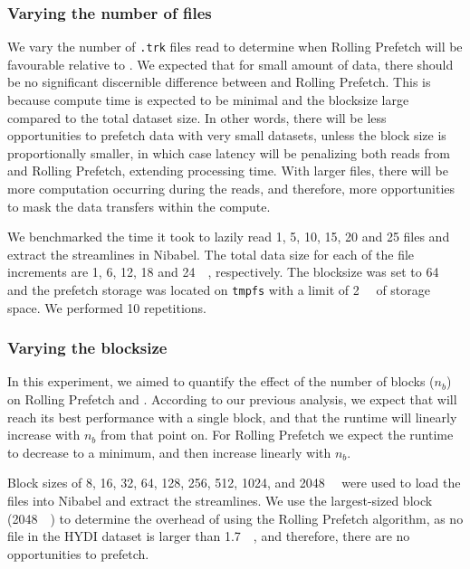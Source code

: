 \documentclass[conference]{IEEEtran}
\begin{document}
\subsubsection{Varying the number of files}\label{exp:files}

We vary the number of \texttt{.trk} files read to determine when Rolling Prefetch will be favourable relative to \sfs. We expected that for small amount of data, there should be no significant discernible difference between \sfs and Rolling Prefetch. This is because compute time is
expected to be minimal and the blocksize large compared to the total dataset size. In other words, there
will be less opportunities to prefetch data with very small datasets, unless the block size is proportionally smaller,
in which case latency will be penalizing both reads from \sfs and Rolling Prefetch, extending processing time. With larger files, there will be more computation occurring during the reads, and therefore, more opportunities
to mask the data transfers within the compute.

We benchmarked the time it took to lazily read 1, 5, 10, 15, 20 and 25 files and extract the streamlines in Nibabel.
The total data size for each of the file increments are 1, 6, 12, 18 and \SI{24}{\gibi\byte},
respectively. The blocksize was set to \SI{64}{\mebi\byte} and the prefetch storage was located on \texttt{tmpfs} with
a limit of \SI{2}{\gibi\byte} of storage space. We performed 10 repetitions.

\subsubsection{Varying the blocksize}\label{exp:blocksize}
In this experiment, we aimed to quantify the effect of the number of blocks ($n_b$) on Rolling Prefetch and \sfs. According to our previous analysis, we expect that \sfs will reach its best performance with a single block, and that the runtime will linearly increase with $n_b$ from that point on. For Rolling Prefetch we expect the runtime to decrease to a minimum, and then increase linearly with $n_b$.


Block sizes of 8, 16, 32, 64, 128, 256, 512, 1024,
and \SI{2048}{\mebi\byte} were used to load the files into Nibabel and extract the streamlines.
We use the 
largest-sized block (\SI{2048}{\mebi\byte}) to determine the
overhead of using the Rolling Prefetch algorithm, as no file in the HYDI dataset is larger than \SI{1.7}{\gibi\byte},
and therefore, there are no opportunities to prefetch.
\end{document}
